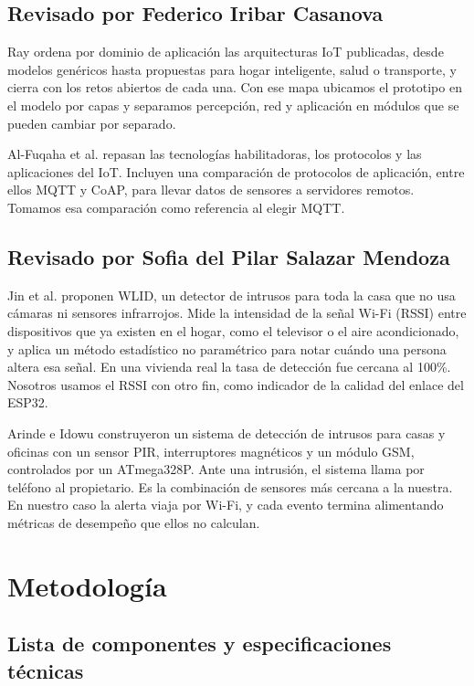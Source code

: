 \documentclass[conference]{IEEEtran}
\begin{document}
\subsection{Revisado por Federico Iribar Casanova}
Ray \cite{ray2018survey} ordena por dominio de aplicación las arquitecturas IoT publicadas, desde modelos genéricos hasta propuestas para hogar inteligente, salud o transporte, y cierra con los retos abiertos de cada una. Con ese mapa ubicamos el prototipo en el modelo por capas y separamos percepción, red y aplicación en módulos que se pueden cambiar por separado.

Al-Fuqaha et al. \cite{alfuqaha2015survey} repasan las tecnologías habilitadoras, los protocolos y las aplicaciones del IoT. Incluyen una comparación de protocolos de aplicación, entre ellos MQTT y CoAP, para llevar datos de sensores a servidores remotos. Tomamos esa comparación como referencia al elegir MQTT.

\subsection{Revisado por Sofia del Pilar Salazar Mendoza}
Jin et al. \cite{jin2018wlid} proponen WLID, un detector de intrusos para toda la casa que no usa cámaras ni sensores infrarrojos. Mide la intensidad de la señal Wi-Fi (RSSI) entre dispositivos que ya existen en el hogar, como el televisor o el aire acondicionado, y aplica un método estadístico no paramétrico para notar cuándo una persona altera esa señal. En una vivienda real la tasa de detección fue cercana al 100\%. Nosotros usamos el RSSI con otro fin, como indicador de la calidad del enlace del ESP32.

Arinde e Idowu \cite{arinde2024multisensor} construyeron un sistema de detección de intrusos para casas y oficinas con un sensor PIR, interruptores magnéticos y un módulo GSM, controlados por un ATmega328P. Ante una intrusión, el sistema llama por teléfono al propietario. Es la combinación de sensores más cercana a la nuestra. En nuestro caso la alerta viaja por Wi-Fi, y cada evento termina alimentando métricas de desempeño que ellos no calculan.

\section{Metodología}
\label{sec:metodologia}

\subsection{Lista de componentes y especificaciones técnicas}
\end{document}

